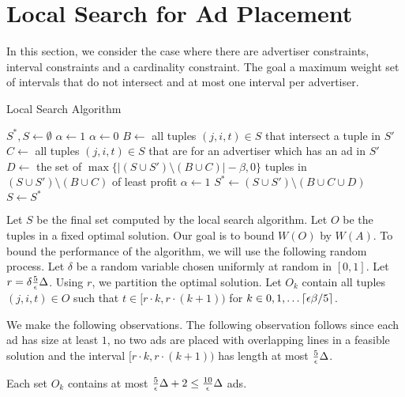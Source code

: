 

\section{Local Search for Ad Placement}
\label{sec:ls}

In this section, we consider the case where there are  advertiser constraints, interval constraints and a cardinality constraint.  The goal a maximum weight set of intervals that do not intersect and at most one interval per advertiser.



\begin{algorithm}[H]
\caption{Local Search Algorithm}
\begin{algorithmic}[1]
\State $S^*,S \leftarrow \emptyset$
\State $\alpha \gets 1$
\State $\alpha \gets 0$ 
\State $B \gets$ all tuples $(j,i,t) \in S$ that intersect a tuple in $S'$
\State $C \gets$ all tuples $(j,i,t) \in S$ that are for an advertiser which has an ad in $S'$
\State $D \gets$ the set of $\max\{|(S\cup S') \setminus (B\cup C)|- \beta, 0 \}$ tuples in $(S\cup S') \setminus (B\cup C)$ of least profit
\State $\alpha \gets 1$
\State $S^* \gets (S\cup S') \setminus (B\cup C\cup D)$
\EndIf
\EndFor
\State $S \gets S^*$
\EndWhile
\end{algorithmic}
\end{algorithm}

Let $S$ be the final set computed by the local search algorithm.  Let $O$ be the tuples in a fixed optimal solution.  Our goal is to bound $W(O)$ by $W(A)$. To bound the performance of the algorithm, we will use the following random process.   Let $\delta$ be a random variable chosen uniformly at random in $[0,1]$.  Let $r = \delta \frac{5}{\epsilon} \Delta$.   Using $r$, we partition the optimal solution.  Let $O_k$ contain  all tuples $(j,i,t) \in O$  such that $t \in [r\cdot k, r \cdot (k+1))$ for $k \in 0, 1, \ldots \lceil \epsilon \beta / 5 \rceil$.  

We make the following observations.  The following observation follows since each ad has size at least $1$, no two ads are placed with overlapping lines in a feasible solution and the interval $[r\cdot k, r \cdot (k+1))$ has length at most $\frac{5}{\epsilon}\Delta$.

\begin{observation}
\label{obs:swapjob}
Each set $O_k$ contains at most $\frac{5}{\epsilon} \Delta +2 \leq \frac{10}{\epsilon}\Delta$ ads.  
\end{observation}

